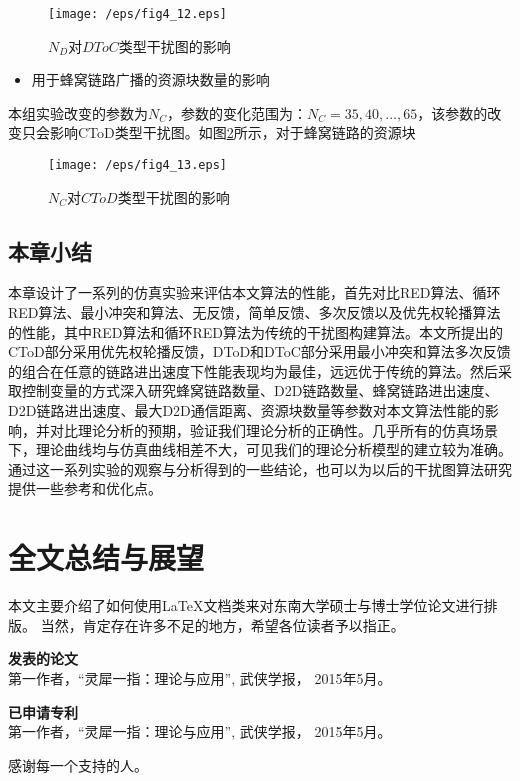 \documentclass[figurelist,tablelist,algorithmlist,nomlist,masters]{seuthesix}
\begin{document}
	\begin{figure}[!h]
		\centering
		\texttt{[image: /eps/fig4\_12.eps]}
		\caption{$N_D$对$DToC$类型干扰图的影响}
		\label{fig4_12}
	\end{figure}
	
	\begin{itemize}
		\item 用于蜂窝链路广播的资源块数量的影响
	\end{itemize}
	
	本组实验改变的参数为$N_{C}$，参数的变化范围为：$N_{C} = 35,40,...,65$，该参数的改变只会影响CToD类型干扰图。如图\ref{fig4_13}所示，对于蜂窝链路的资源块
	
	
	\begin{figure}[!h]
		\centering
		\texttt{[image: /eps/fig4\_13.eps]}
		\caption{$N_C$对$CToD$类型干扰图的影响}
		\label{fig4_13}
	\end{figure}
	
	\section{本章小结}
	
	本章设计了一系列的仿真实验来评估本文算法的性能，首先对比RED算法、循环RED算法、最小冲突和算法、无反馈，简单反馈、多次反馈以及优先权轮播算法的性能，其中RED算法和循环RED算法为传统的干扰图构建算法。本文所提出的CToD部分采用优先权轮播反馈，DToD和DToC部分采用最小冲突和算法多次反馈的组合在任意的链路进出速度下性能表现均为最佳，远远优于传统的算法。然后采取控制变量的方式深入研究蜂窝链路数量、D2D链路数量、蜂窝链路进出速度、D2D链路进出速度、最大D2D通信距离、资源块数量等参数对本文算法性能的影响，并对比理论分析的预期，验证我们理论分析的正确性。几乎所有的仿真场景下，理论曲线均与仿真曲线相差不大，可见我们的理论分析模型的建立较为准确。通过这一系列实验的观察与分析得到的一些结论，也可以为以后的干扰图算法研究提供一些参考和优化点。
	
	\chapter{全文总结与展望}
	本文主要介绍了如何使用\seuthesix \LaTeX 文档类来对东南大学硕士与博士学位论文进行排版。
	当然，\seuthesix 肯定存在许多不足的地方，希望各位读者予以指正。
	
	
	\begin{flushleft}
		{\bfseries \large 发表的论文}\\ \relax
		[1] 第一作者，“灵犀一指：理论与应用”, 武侠学报，
		2015年5月。\\
	\end{flushleft}
	\begin{flushleft}
		{\bfseries \large 已申请专利}\\ \relax
		[1] 第一作者，“灵犀一指：理论与应用”, 武侠学报，
		2015年5月。\\
	\end{flushleft}

	\acknowledgement
	感谢每一个支持\seuthesix 的人。
\end{document}
